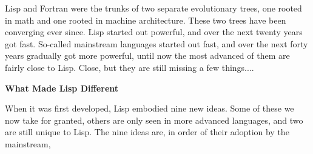 Lisp
                  and Fortran were the trunks of two separate evolutionary
                  trees, one rooted in math and one rooted in machine
                  architecture. These two trees have been converging ever since.
                  Lisp started out powerful, and over the next twenty years got
                  fast. So-called mainstream languages started out fast, and
                  over the next forty years gradually got more powerful, until
                  now the most advanced of them are fairly close to Lisp. Close,
                  but they are still missing a few things....

\textbf{What Made Lisp Different}

When it was first developed, Lisp embodied nine
                  new ideas. Some of these we now take for granted, others are
                  only seen in more advanced languages, and two are still unique
                  to Lisp. The nine ideas are, in order of their adoption by the
                  mainstream,
